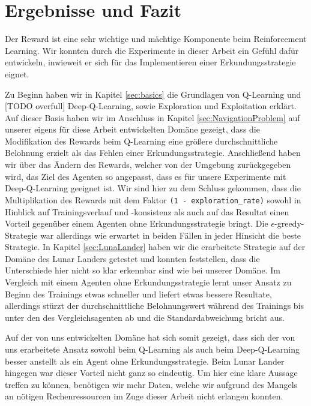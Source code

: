 \chapter{Ergebnisse und Fazit} \label{sec:conclusion}
Der Reward ist eine sehr wichtige und mächtige Komponente beim Reinforcement Learning. Wir konnten durch die Experimente in dieser Arbeit ein Gefühl dafür entwickeln, inwieweit er sich für das Implementieren einer Erkundungsstrategie eignet.

Zu Beginn haben wir in Kapitel \ref{sec:basics} die Grundlagen von Q-Learning und [TODO overfull] Deep-Q-Learning, sowie Exploration und Exploitation erklärt. Auf dieser Basis haben wir im Anschluss in Kapitel \ref{sec:NavigationProblem} auf unserer eigens für diese Arbeit entwickelten Domäne gezeigt, dass die Modifikation des Rewards beim Q-Learning eine größere durchschnittliche Belohnung erzielt als das Fehlen einer Erkundungsstrategie. Anschließend haben wir über das Ändern des Rewards, welcher von der Umgebung zurückgegeben wird, das Ziel des Agenten so angepasst, dass es für unsere Experimente mit Deep-Q-Learning geeignet ist. Wir sind hier zu dem Schluss gekommen, dass die Multiplikation des Rewards mit dem Faktor \texttt{(1 - exploration_rate)} sowohl in Hinblick auf Trainingsverlauf und -konsistenz als auch auf das Resultat einen Vorteil gegenüber einem Agenten ohne Erkundungsstrategie bringt. Die $ \epsilon $-greedy-Strategie war allerdings wie erwartet in beiden Fällen in jeder Hinsicht die beste Strategie. In Kapitel \ref{sec:LunaLander} haben wir die erarbeitete Strategie auf der Domäne des Lunar Landers getestet und konnten feststellen, dass die Unterschiede hier nicht so klar erkennbar sind wie bei unserer Domäne. Im Vergleich mit einem Agenten ohne Erkundungsstrategie lernt unser Ansatz zu Beginn des Trainings etwas schneller und liefert etwas bessere Resultate, allerdings stürzt der durchschnittliche Belohnungswert während des Trainings bis unter den des Vergleichsagenten ab und die Standardabweichung bricht aus.

Auf der von uns entwickelten Domäne hat sich somit gezeigt, dass sich der von uns erarbeitete Ansatz sowohl beim Q-Learning als auch beim Deep-Q-Learning besser anstellt als ein Agent ohne Erkundungsstrategie. Beim Lunar Lander hingegen war dieser Vorteil nicht ganz so eindeutig. Um hier eine klare Aussage treffen zu können, benötigen wir mehr Daten, welche wir aufgrund des Mangels an nötigen Rechenressourcen im Zuge dieser Arbeit nicht erlangen konnten. 

